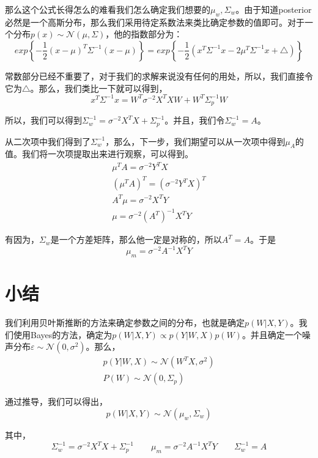 \documentclass[a4paper]{article}
\begin{document}
那么这个公式长得怎么的难看我们怎么确定我们想要的$\mu_w,\Sigma_w$。由于知道posterior必然是一个高斯分布，那么我们采用待定系数法来类比确定参数的值即可。对于一个分布$p(x)\sim \mathcal{N}(\mu,\Sigma)$，他的指数部分为：
\begin{equation}
    exp\left\{ -\frac{1}{2}(x-\mu)^T\Sigma^{-1}(x-\mu) \right\} 
    = 
    exp\left\{ -\frac{1}{2}(x^T\Sigma^{-1}x - 2\mu^T\Sigma^{-1}x + \triangle) \right\}
\end{equation}

常数部分已经不重要了，对于我们的求解来说没有任何的用处，所以，我们直接令它为$\triangle$。那么，我们类比一下就可以得到，
\begin{equation}
    x^T\Sigma^{-1}x = W^T\sigma^{-2}X^TXW+ W^T\Sigma_p^{-1}W
\end{equation}

所以，我们可以得到$\Sigma_w^{-1}=\sigma^{-2}X^TX+\Sigma_p^{-1}$。并且，我们令$\Sigma_w^{-1}=A$。

从二次项中我们得到了$\Sigma_w^{-1}$，那么，下一步，我们期望可以从一次项中得到$\mu_A$的值。我们将一次项提取出来进行观察，可以得到。
\begin{gather}
    \mu^TA = \sigma^{-2}Y^TX \\
    (\mu^TA)^T = (\sigma^{-2}Y^TX)^T \\
    A^T\mu = \sigma^{-2}X^TY \\
    \mu = \sigma^{-2}(A^T)^{-1}X^TY 
\end{gather}

有因为，$\Sigma_w$是一个方差矩阵，那么他一定是对称的，所以$A^T=A$。于是
\begin{equation}
    \mu_m = \sigma^{-2}A^{-1}X^TY
\end{equation}

\section{小结}
我们利用贝叶斯推断的方法来确定参数之间的分布，也就是确定$p(W|X,Y)$。我们使用Bayes的方法，确定为$p(W|X,Y)\propto p(Y|W,X)p(W)$。并且确定一个噪声分布$\varepsilon\sim\mathcal{N}(0,\sigma^2)$。那么，
\begin{gather}
    p(Y|W,X) \sim \mathcal{N}(W^TX,\sigma^2) \\
    P(W) \sim \mathcal{N}(0,\Sigma_p)
\end{gather}

通过推导，我们可以得出，
\begin{equation}
    p(W|X,Y) \sim \mathcal{N}(\mu_w, \Sigma_w)
\end{equation}

其中，
\begin{equation}
    \Sigma_w^{-1}=\sigma^{-2}X^TX+\Sigma_p^{-1} \qquad \mu_m = \sigma^{-2}A^{-1}X^TY \qquad \Sigma_w^{-1}=A
\end{equation}
\end{document}
